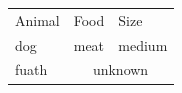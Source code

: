 \documentclass{article}
\begin{document}
\begin{tabular}{lll}
Animal & Food & Size \\
dog & meat & medium \\
fuath & \multicolumn{2}{c}{unknown} \\
\end{tabular}
\end{document}
